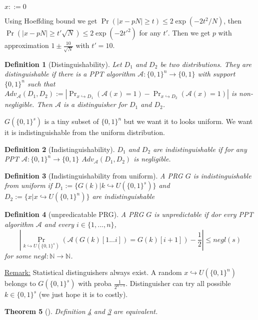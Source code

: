 \documentclass{article}
\newtheorem{thm}{Theorem}[section]
\newtheorem{defi}[thm]{Definition}
\newcommand{\Thm}[3]{\begin{thm}[#1]\label{#2}#3\end{thm}}
\newcommand{\Def}[3]{\begin{defi}[#1]\label{#2}#3\end{defi}}
\newcommand{\Rem}{\underline{Remark:} }
\newcommand{\N}{\mathbb{N}}
\newcommand{\A}{\mathcal{A}}
\begin{document}
\begin{algorithme}
$x::=0$\\
\end{algorithme}

Using Hoeffding bound we get $\Pr(|x-pN|\geq t)\leq 2\exp(-2t^2/N)$, then $\Pr(|x-pN|\geq t'\sqrt{N})\leq 2\exp(-2t'^2)$ for any $t'$. Then we get $p$ with approximation $1\pm\frac{10}{\sqrt{N}}$ with $t'=10$.


\Def{Distinguishability}{def:disting}{Let $D_1$ and $D_2$ be two distributions. They are distinguishable if there is a PPT algorithm $\mathcal{A}:\{0,1\}^n\rightarrow\{0,1\}$ with support $\{0,1\}^n$ such that $Adv_\mathcal{A}(D_1,D_2) := |\Pr_{x\hookrightarrow D_1}(\mathcal{A}(x)=1)-\Pr_{x\hookrightarrow D_2}(\mathcal{A}(x)=1)|$ is non-negligible. Then $\mathcal{A}$ is a distinguisher for $D_1$ and $D_2$.}

$G(\{0,1\}^s)$ is a tiny subset of $\{0,1\}^n$ but we want it to looks uniform. We want it is indistinguishable from the uniform distribution.

\Def{Indistinguishability}{def:indisting}{$D_1$ and $D_2$ are indistinguishable if for any PPT $\mathcal{A}:\{0,1\}^n\rightarrow\{0,1\}$ $Adv_\mathcal{A}(D_1,D_2)$ is negligible.}

\Def{Indistinguishability from uniform}{def:unifPRG}{A PRG $G$ is indistinguishable from uniform if $D_1:=\{G(k)|k\hookrightarrow U(\{0,1\}^s)\}$ and $D_2:=\{x|x\hookrightarrow U(\{0,1\}^n)\}$ are indistinguishable} 

\Def{unpredicatable PRG}{def:unpredPRG}{A PRG $G$ is unpredictable if dor evry PPT algorithm $\A$ and every $i\in\{1,...,n\}$,
\[|\Pr_{k\hookrightarrow U(\{0,1\}^s)}(\A(G(k)[1...i])=G(k)[i+1])-\frac{1}{2}|\leq negl(s)\]
for some $negl:\N\rightarrow\N$.
}

\Rem Statistical distinguishers always exist. A random $x\hookrightarrow U(\{0,1\}^n)$ belongs to $G(\{0,1\}^s)$ with proba $\frac{1}{2^{n-s}}$. Distinguisher can try all possible $k\in\{0,1\}^s$ (we just hope it is to costly).

\Thm{}{thm:indisUnpredEquiv}{Definition \ref{def:unpredPRG} and \ref{def:unifPRG} are equivalent.}
\end{document}
